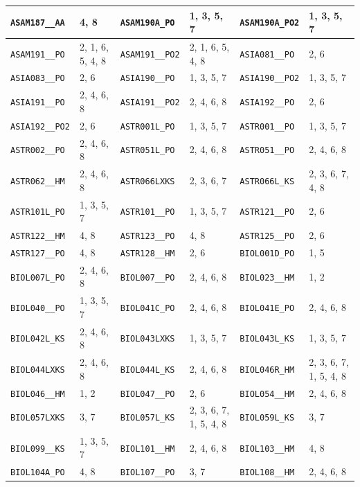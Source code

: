 \begin{longtable}{|l|l||l|l||l|l|}
    \verb|ASAM187__AA| & 4, 8 & \verb|ASAM190A_PO| & 1, 3, 5, 7 & \verb|ASAM190A_PO2| & 1, 3, 5, 7\\\hline
    \verb|ASAM191__PO| & 2, 1, 6, 5, 4, 8 & \verb|ASAM191__PO2| & 2, 1, 6, 5, 4, 8 & \verb|ASIA081__PO| & 2, 6\\\hline
    \verb|ASIA083__PO| & 2, 6 & \verb|ASIA190__PO| & 1, 3, 5, 7 & \verb|ASIA190__PO2| & 1, 3, 5, 7\\\hline
    \verb|ASIA191__PO| & 2, 4, 6, 8 & \verb|ASIA191__PO2| & 2, 4, 6, 8 & \verb|ASIA192__PO| & 2, 6\\\hline
    \verb|ASIA192__PO2| & 2, 6 & \verb|ASTR001L_PO| & 1, 3, 5, 7 & \verb|ASTR001__PO| & 1, 3, 5, 7\\\hline
    \verb|ASTR002__PO| & 2, 4, 6, 8 & \verb|ASTR051L_PO| & 2, 4, 6, 8 & \verb|ASTR051__PO| & 2, 4, 6, 8\\\hline
    \verb|ASTR062__HM| & 2, 4, 6, 8 & \verb|ASTR066LXKS| & 2, 3, 6, 7 & \verb|ASTR066L_KS| & 2, 3, 6, 7, 4, 8\\\hline
    \verb|ASTR101L_PO| & 1, 3, 5, 7 & \verb|ASTR101__PO| & 1, 3, 5, 7 & \verb|ASTR121__PO| & 2, 6\\\hline
    \verb|ASTR122__HM| & 4, 8 & \verb|ASTR123__PO| & 4, 8 & \verb|ASTR125__PO| & 2, 6\\\hline
    \verb|ASTR127__PO| & 4, 8 & \verb|ASTR128__HM| & 2, 6 & \verb|BIOL001D_PO| & 1, 5\\\hline
    \verb|BIOL007L_PO| & 2, 4, 6, 8 & \verb|BIOL007__PO| & 2, 4, 6, 8 & \verb|BIOL023__HM| & 1, 2\\\hline
    \verb|BIOL040__PO| & 1, 3, 5, 7 & \verb|BIOL041C_PO| & 2, 4, 6, 8 & \verb|BIOL041E_PO| & 2, 4, 6, 8\\\hline
    \verb|BIOL042L_KS| & 2, 4, 6, 8 & \verb|BIOL043LXKS| & 1, 3, 5, 7 & \verb|BIOL043L_KS| & 1, 3, 5, 7\\\hline
    \verb|BIOL044LXKS| & 2, 4, 6, 8 & \verb|BIOL044L_KS| & 2, 4, 6, 8 & \verb|BIOL046R_HM| & 2, 3, 6, 7, 1, 5, 4, 8\\\hline
    \verb|BIOL046__HM| & 1, 2 & \verb|BIOL047__PO| & 2, 6 & \verb|BIOL054__HM| & 2, 4, 6, 8\\\hline
    \verb|BIOL057LXKS| & 3, 7 & \verb|BIOL057L_KS| & 2, 3, 6, 7, 1, 5, 4, 8 & \verb|BIOL059L_KS| & 3, 7\\\hline
    \verb|BIOL099__KS| & 1, 3, 5, 7 & \verb|BIOL101__HM| & 2, 4, 6, 8 & \verb|BIOL103__HM| & 4, 8\\\hline
    \verb|BIOL104A_PO| & 4, 8 & \verb|BIOL107__PO| & 3, 7 & \verb|BIOL108__HM| & 2, 4, 6, 8\\\hline

\end{longtable}
